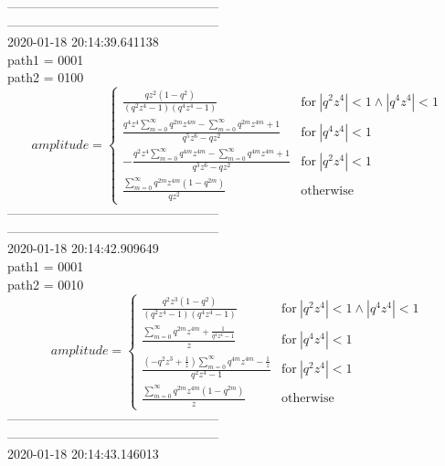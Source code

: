 --------------------------------------------------\\
--------------------------------------------------\\
2020-01-18 20:14:39.641138\\
path1 = 0001\\
path2 = 0100\\
$$amplitude = \begin{cases} \frac{q z^{2} \left(1 - q^{2}\right)}{\left(q^{2} z^{4} - 1\right) \left(q^{4} z^{4} - 1\right)} & \text{for}\: \left|{q^{2} z^{4}}\right| < 1 \wedge \left|{q^{4} z^{4}}\right| < 1 \\\frac{q^{4} z^{4} \sum_{m=0}^{\infty} q^{2 m} z^{4 m} - \sum_{m=0}^{\infty} q^{2 m} z^{4 m} + 1}{q^{5} z^{6} - q z^{2}} & \text{for}\: \left|{q^{4} z^{4}}\right| < 1 \\- \frac{q^{2} z^{4} \sum_{m=0}^{\infty} q^{4 m} z^{4 m} - \sum_{m=0}^{\infty} q^{4 m} z^{4 m} + 1}{q^{3} z^{6} - q z^{2}} & \text{for}\: \left|{q^{2} z^{4}}\right| < 1 \\\frac{\sum_{m=0}^{\infty} q^{2 m} z^{4 m} \left(1 - q^{2 m}\right)}{q z^{2}} & \text{otherwise} \end{cases}$$
--------------------------------------------------\\
--------------------------------------------------\\
2020-01-18 20:14:42.909649\\
path1 = 0001\\
path2 = 0010\\
$$amplitude = \begin{cases} \frac{q^{2} z^{3} \left(1 - q^{2}\right)}{\left(q^{2} z^{4} - 1\right) \left(q^{4} z^{4} - 1\right)} & \text{for}\: \left|{q^{2} z^{4}}\right| < 1 \wedge \left|{q^{4} z^{4}}\right| < 1 \\\frac{\sum_{m=0}^{\infty} q^{2 m} z^{4 m} + \frac{1}{q^{4} z^{4} - 1}}{z} & \text{for}\: \left|{q^{4} z^{4}}\right| < 1 \\\frac{\left(- q^{2} z^{3} + \frac{1}{z}\right) \sum_{m=0}^{\infty} q^{4 m} z^{4 m} - \frac{1}{z}}{q^{2} z^{4} - 1} & \text{for}\: \left|{q^{2} z^{4}}\right| < 1 \\\frac{\sum_{m=0}^{\infty} q^{2 m} z^{4 m} \left(1 - q^{2 m}\right)}{z} & \text{otherwise} \end{cases}$$
--------------------------------------------------\\
--------------------------------------------------\\
2020-01-18 20:14:43.146013\\
